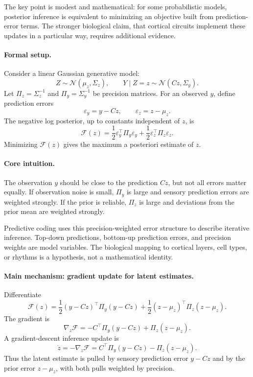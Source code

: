 The key point is modest and mathematical: for some probabilistic models, posterior inference is equivalent to minimizing an objective built from prediction-error terms. The stronger biological claim, that cortical circuits implement these updates in a particular way, requires additional evidence.

\paragraph{Formal setup.}
Consider a linear Gaussian generative model:
\[
Z\sim\mathcal N(\mu_z,\Sigma_z),
\qquad
Y\mid Z=z\sim\mathcal N(Cz,\Sigma_y).
\]
Let \(\Pi_z=\Sigma_z^{-1}\) and \(\Pi_y=\Sigma_y^{-1}\) be precision matrices. For an observed \(y\), define prediction errors
\[
\varepsilon_y=y-Cz,
\qquad
\varepsilon_z=z-\mu_z.
\]
The negative log posterior, up to constants independent of \(z\), is
\[
\boxed{
\mathcal F(z)
=\frac12\varepsilon_y^\top\Pi_y\varepsilon_y
+
\frac12\varepsilon_z^\top\Pi_z\varepsilon_z.
}
\]
Minimizing \(\mathcal F(z)\) gives the maximum a posteriori estimate of \(z\).

\paragraph{Core intuition.}
The observation \(y\) should be close to the prediction \(Cz\), but not all errors matter equally. If observation noise is small, \(\Pi_y\) is large and sensory prediction errors are weighted strongly. If the prior is reliable, \(\Pi_z\) is large and deviations from the prior mean are weighted strongly.

Predictive coding uses this precision-weighted error structure to describe iterative inference. Top-down predictions, bottom-up prediction errors, and precision weights are model variables. The biological mapping to cortical layers, cell types, or rhythms is a hypothesis, not a mathematical identity.

\paragraph{Main mechanism: gradient update for latent estimates.}
Differentiate
\[
\mathcal F(z)
=\frac12(y-Cz)^\top\Pi_y(y-Cz)
+
\frac12(z-\mu_z)^\top\Pi_z(z-\mu_z).
\]
The gradient is
\[
\nabla_z\mathcal F
=-C^\top\Pi_y(y-Cz)+\Pi_z(z-\mu_z).
\]
A gradient-descent inference update is
\[
\boxed{
\dot z
=-\nabla_z\mathcal F
=C^\top\Pi_y(y-Cz)-\Pi_z(z-\mu_z).
}
\]
Thus the latent estimate is pulled by sensory prediction error \(y-Cz\) and by the prior error \(z-\mu_z\), with both pulls weighted by precision.

